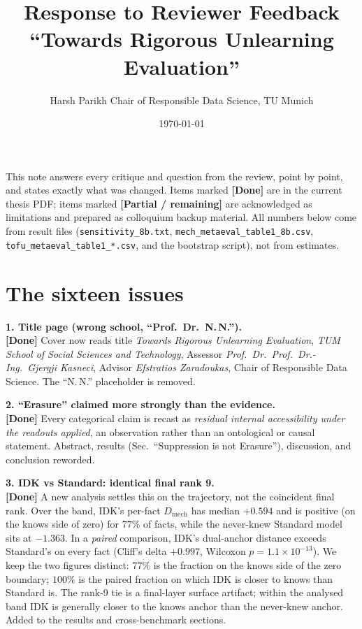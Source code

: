 \documentclass[11pt,a4paper]{article}
\title{\vspace{-1.2cm}Response to Reviewer Feedback\\[2pt]\large ``Towards Rigorous Unlearning Evaluation''}
\author{Harsh Parikh \quad\textbullet\quad Chair of Responsible Data Science, TU Munich}
\date{\today}
\newcommand{\dmech}{\ensuremath{D_{\text{mech}}}}
\newcommand{\done}{\textbf{\textcolor{black!80}{[Done]}}}
\newcommand{\pend}{\textbf{\textcolor{black!55}{[Partial / remaining]}}}
\newcommand{\issue}[1]{\medskip\noindent\textbf{#1}\\}
\begin{document}
\maketitle
\vspace{-0.6cm}

\noindent This note answers every critique and question from the review, point by point, and states
exactly what was changed. Items marked \done{} are in the current thesis PDF; items marked \pend{} are
acknowledged as limitations and prepared as colloquium backup material. All numbers below come from
result files (\texttt{sensitivity\_8b.txt}, \texttt{mech\_metaeval\_table1\_8b.csv},
\texttt{tofu\_metaeval\_table1\_*.csv}, and the bootstrap script), not from estimates.

\section{The sixteen issues}

\issue{1. Title page (wrong school, ``Prof.\ Dr.\ N.\,N.'').}
\done{} Cover now reads title \emph{Towards Rigorous Unlearning Evaluation}, \emph{TUM School of Social
Sciences and Technology}, Assessor \emph{Prof.\ Dr.\ Prof.\ Dr.-Ing.\ Gjergji Kasneci}, Advisor
\emph{Efstratios Zaradoukas}, Chair of Responsible Data Science. The ``N.\,N.'' placeholder is removed.

\issue{2. ``Erasure'' claimed more strongly than the evidence.}
\done{} Every categorical claim is recast as \emph{residual internal accessibility under the readouts
applied}, an observation rather than an ontological or causal statement. Abstract, results
(Sec.~``Suppression is not Erasure''), discussion, and conclusion reworded.

\issue{3. IDK vs Standard: identical final rank 9.}
\done{} A new analysis settles this on the trajectory, not the coincident final rank. Over the band, IDK's
per-fact \dmech{} has median $+0.594$ and is positive (on the knows side of zero) for $77\%$ of facts, while
the never-knew Standard model sits at $-1.363$. In a \emph{paired} comparison, IDK's dual-anchor distance
exceeds Standard's on every fact (Cliff's delta $+0.997$, Wilcoxon $p=1.1\times10^{-13}$). We keep the two
figures distinct: $77\%$ is the fraction on the knows side of the zero boundary; $100\%$ is the paired
fraction on which IDK is closer to knows than Standard is. The rank-9 tie is a final-layer surface artifact;
within the analysed band IDK is generally closer to the knows anchor than the never-knew anchor. Added to
the results and cross-benchmark sections.
\end{document}
